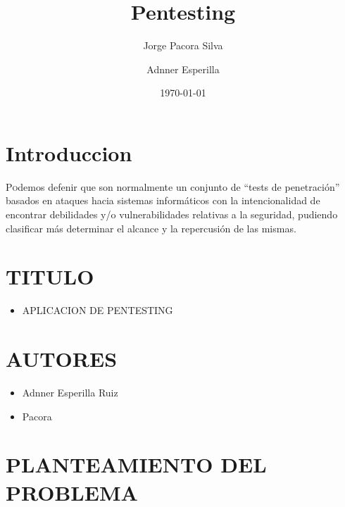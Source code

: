 \documentclass[twoside,twocolumn]{article}
\title{ Pentesting} %
\author{Jorge Pacora Silva }
\author{Adnner Esperilla }
\date{\today} %
\begin{document}
\maketitle


\section{Introduccion}

\lettrine[nindent=0em,lines=3]{P}odemos defenir que son normalmente un conjunto de “tests de penetración” basados en ataques hacia sistemas informáticos con la intencionalidad de encontrar debilidades y/o vulnerabilidades relativas a la seguridad, pudiendo clasificar más determinar el alcance y la repercusión de las mismas.

\section{TITULO}
\begin{itemize}
\item APLICACION DE PENTESTING
\end{itemize}
\section{AUTORES}
\begin{itemize}
\item Adnner Esperilla Ruiz
\item Pacora
\end{itemize}
\section{PLANTEAMIENTO DEL PROBLEMA}
\end{document}
